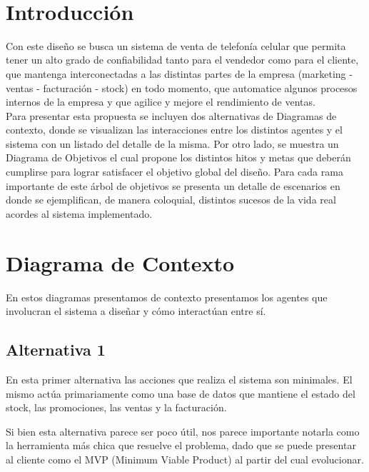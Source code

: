 ‌\section{Introducción}
Con este diseño se busca un sistema de venta de telefonía celular que permita tener un alto grado de confiabilidad tanto para el vendedor como para el cliente, que mantenga interconectadas a las distintas partes de la empresa (marketing - ventas - facturación - stock) en todo momento, que automatice algunos procesos internos de la empresa y que agilice y mejore el rendimiento de ventas.\\
\indent Para presentar esta propuesta se incluyen dos alternativas de Diagramas de contexto, donde se visualizan las interacciones entre los distintos agentes y el sistema con un listado del detalle de la misma. Por otro lado, se muestra un Diagrama de Objetivos el cual propone los distintos hitos y metas que deberán cumplirse para lograr satisfacer el objetivo global del diseño. Para cada rama importante de este árbol de objetivos se presenta un detalle de escenarios en donde se ejemplifican, de manera coloquial, distintos sucesos de la vida real acordes al sistema implementado.\\

\section{Diagrama de Contexto}

En estos diagramas presentamos de contexto presentamos los agentes que 
involucran el sistema a diseñar y cómo interactúan entre sí.

\subsection{Alternativa 1}

En esta primer alternativa las acciones que realiza el sistema son minimales.
El mismo actúa primariamente como una base de datos que mantiene el estado del 
stock, las promociones, las ventas y la facturación.

Si bien esta alternativa parece ser poco útil, nos parece importante notarla 
como la herramienta más chica que resuelve el problema, dado que se puede presentar 
al cliente como el MVP (Minimum Viable Product) al partir del cual evolucionar.

